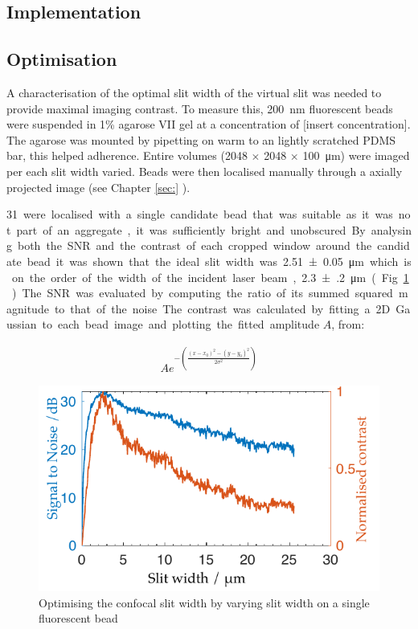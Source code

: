 \subsection{Implementation}




\subsection{Optimisation}

A characterisation of the optimal slit width of the virtual slit was needed to provide maximal imaging contrast.
To measure this, \SI{200}{\nano\metre} fluorescent beads were suspended in 1\% agarose VII gel at a concentration of [insert concentration]. %
The agarose was mounted by pipetting on warm to an lightly scratched PDMS bar, this helped adherence.
Entire volumes (2048 $\times$ 2048 $\times$ \SI{100}{\micro\metre}) were imaged per each slit width varied.
Beads were then localised manually through a axially projected image (see Chapter \ref{sec:} %
).

\SI{31} were localised with a single candidate bead that was suitable as it was not part of an aggregate, it was sufficiently bright and unobscured.
By analysing both the SNR and the contrast of each cropped window around the candidate bead it was shown that the ideal slit width was \SI{2.51(5)}{\micro\metre} which is on the order of the width of the incident laser beam, \SI{2.3(2)}{\micro\metre} (Fig. \ref{fig:optimal_slit_snr_contrast}).
The SNR was evaluated by computing the ratio of its summed squared magnitude to that of the noise.
The contrast was calculated by fitting a 2D Gaussian to each bead image and plotting the fitted amplitude $A$, from:

\begin{align}
  A e^{-\left(\frac{(x-x_0)^2-(y-y_0)^2}{2\sigma^2}\right)}
\end{align}

\begin{figure}
  \centering
  \includegraphics{Chapters/dualslit/Figs/PDF/optimal_slit_snr_contrast}
  \caption{Optimising the confocal slit width by varying slit width on a single fluorescent bead}
  \label{fig:optimal_slit_snr_contrast}
\end{figure}


